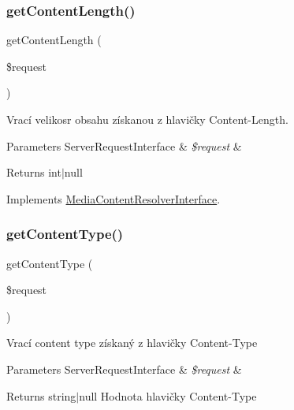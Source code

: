 \subsubsection{\texorpdfstring{get\+Content\+Length()}{getContentLength()}}
{\footnotesize\ttfamily get\+Content\+Length (\begin{DoxyParamCaption}\item[{Server\+Request\+Interface}]{\$request }\end{DoxyParamCaption})}

Vrací velikosr obsahu získanou z hlavičky Content-\/\+Length.


\begin{DoxyParams}[1]{Parameters}
Server\+Request\+Interface & {\em \$request} & \\
\hline
\end{DoxyParams}
\begin{DoxyReturn}{Returns}
int$\vert$null 
\end{DoxyReturn}


Implements \mbox{\hyperlink{interface_pes_1_1_http_1_1_request_1_1_media_content_resolver_interface_aa5886a7afae000593a639e649d411ca5}{Media\+Content\+Resolver\+Interface}}.

\mbox{\label{class_pes_1_1_http_1_1_request_1_1_media_content_resolver_a5e069384f33f60671b832beae5260d9b}} 
\subsubsection{\texorpdfstring{get\+Content\+Type()}{getContentType()}}
{\footnotesize\ttfamily get\+Content\+Type (\begin{DoxyParamCaption}\item[{Server\+Request\+Interface}]{\$request }\end{DoxyParamCaption})}

Vrací content type získaný z hlavičky Content-\/\+Type


\begin{DoxyParams}[1]{Parameters}
Server\+Request\+Interface & {\em \$request} & \\
\hline
\end{DoxyParams}
\begin{DoxyReturn}{Returns}
string$\vert$null Hodnota hlavičky Content-\/\+Type 
\end{DoxyReturn}


